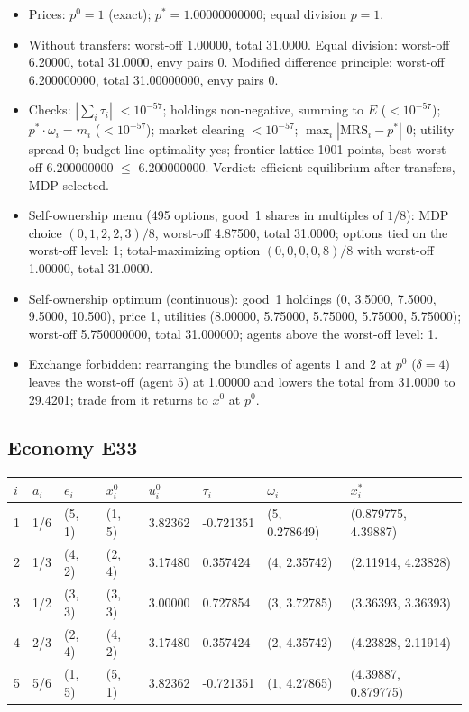 \begin{itemize}[leftmargin=1.2em,itemsep=0pt,topsep=2pt]\footnotesize
\item Prices: $p^0 = 1$ (exact); $p^* = 1.00000000000$; equal division $p = 1$.
\item Without transfers: worst-off 1.00000, total 31.0000. Equal division: worst-off 6.20000, total 31.0000, envy pairs 0. Modified difference principle: worst-off 6.200000000, total 31.00000000, envy pairs 0.
\item Checks: $|\sum_i\tau_i|$ $<10^{-57}$; holdings non-negative, summing to $E$ ($<10^{-57}$); $p^*\cdot\omega_i = m_i$ ($<10^{-57}$); market clearing $<10^{-57}$; $\max_i|\mathrm{MRS}_i - p^*|$ 0; utility spread 0; budget-line optimality yes; frontier lattice 1001 points, best worst-off 6.200000000 $\leq$ 6.200000000. Verdict: efficient equilibrium after transfers, MDP-selected.
\item Self-ownership menu (495 options, good~1 shares in multiples of $1/8$): MDP choice $(0, 1, 2, 2, 3)/8$, worst-off 4.87500, total 31.0000; options tied on the worst-off level: 1; total-maximizing option $(0, 0, 0, 0, 8)/8$ with worst-off 1.00000, total 31.0000.
\item Self-ownership optimum (continuous): good~1 holdings (0, 3.5000, 7.5000, 9.5000, 10.500), price 1, utilities (8.00000, 5.75000, 5.75000, 5.75000, 5.75000); worst-off 5.750000000, total 31.000000; agents above the worst-off level: 1.
\item Exchange forbidden: rearranging the bundles of agents 1 and 2 at $p^0$ ($\delta = 4$) leaves the worst-off (agent 5) at 1.00000 and lowers the total from 31.0000 to 29.4201; trade from it returns to $x^0$ at $p^0$.
\end{itemize}

\subsection*{Economy E33}
\label{ec:E33}
{\scriptsize\setlength{\tabcolsep}{3pt}
\begin{tabular}{@{}llllllll@{}}
\toprule
$i$ & $a_i$ & $e_i$ & $x^0_i$ & $u^0_i$ & $\tau_i$ & $\omega_i$ & $x^*_i$ \\
\midrule
1 & 1/6 & (5, 1) & (1, 5) & 3.82362 & -0.721351 & (5, 0.278649) & (0.879775, 4.39887) \\
2 & 1/3 & (4, 2) & (2, 4) & 3.17480 & 0.357424 & (4, 2.35742) & (2.11914, 4.23828) \\
3 & 1/2 & (3, 3) & (3, 3) & 3.00000 & 0.727854 & (3, 3.72785) & (3.36393, 3.36393) \\
4 & 2/3 & (2, 4) & (4, 2) & 3.17480 & 0.357424 & (2, 4.35742) & (4.23828, 2.11914) \\
5 & 5/6 & (1, 5) & (5, 1) & 3.82362 & -0.721351 & (1, 4.27865) & (4.39887, 0.879775) \\
\bottomrule\end{tabular}}

